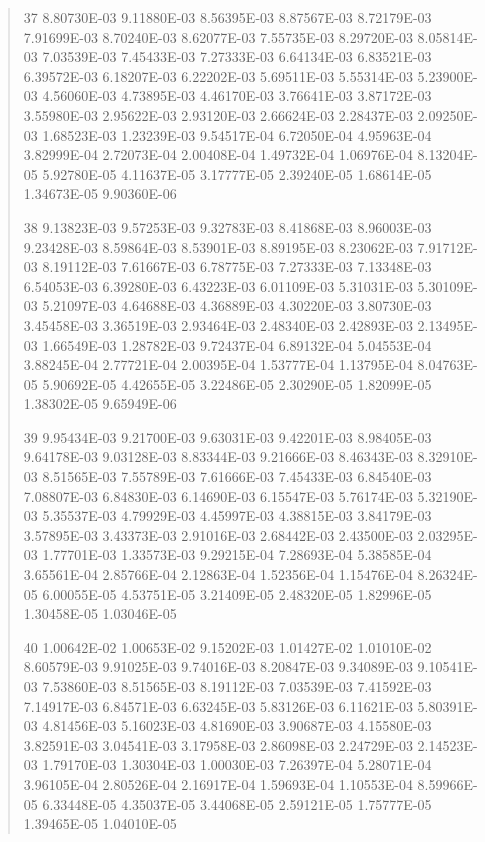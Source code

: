 \documentclass[letterpaper,10pt,english]{sphinxmanual}
\begin{document}
\begin{quote}
\begin{DUlineblock}{0em}
\item[] 37   8.80730E-03  9.11880E-03  8.56395E-03  8.87567E-03  8.72179E-03  7.91699E-03  8.70240E-03  8.62077E-03  7.55735E-03  8.29720E-03  8.05814E-03  7.03539E-03  7.45433E-03  7.27333E-03  6.64134E-03  6.83521E-03  6.39572E-03  6.18207E-03  6.22202E-03  5.69511E-03  5.55314E-03  5.23900E-03  4.56060E-03  4.73895E-03  4.46170E-03  3.76641E-03  3.87172E-03  3.55980E-03  2.95622E-03  2.93120E-03  2.66624E-03  2.28437E-03  2.09250E-03  1.68523E-03  1.23239E-03  9.54517E-04  6.72050E-04  4.95963E-04  3.82999E-04  2.72073E-04  2.00408E-04  1.49732E-04  1.06976E-04  8.13204E-05  5.92780E-05  4.11637E-05  3.17777E-05  2.39240E-05  1.68614E-05  1.34673E-05  9.90360E-06
\item[] 38   9.13823E-03  9.57253E-03  9.32783E-03  8.41868E-03  8.96003E-03  9.23428E-03  8.59864E-03  8.53901E-03  8.89195E-03  8.23062E-03  7.91712E-03  8.19112E-03  7.61667E-03  6.78775E-03  7.27333E-03  7.13348E-03  6.54053E-03  6.39280E-03  6.43223E-03  6.01109E-03  5.31031E-03  5.30109E-03  5.21097E-03  4.64688E-03  4.36889E-03  4.30220E-03  3.80730E-03  3.45458E-03  3.36519E-03  2.93464E-03  2.48340E-03  2.42893E-03  2.13495E-03  1.66549E-03  1.28782E-03  9.72437E-04  6.89132E-04  5.04553E-04  3.88245E-04  2.77721E-04  2.00395E-04  1.53777E-04  1.13795E-04  8.04763E-05  5.90692E-05  4.42655E-05  3.22486E-05  2.30290E-05  1.82099E-05  1.38302E-05  9.65949E-06
\item[] 39   9.95434E-03  9.21700E-03  9.63031E-03  9.42201E-03  8.98405E-03  9.64178E-03  9.03128E-03  8.83344E-03  9.21666E-03  8.46343E-03  8.32910E-03  8.51565E-03  7.55789E-03  7.61666E-03  7.45433E-03  6.84540E-03  7.08807E-03  6.84830E-03  6.14690E-03  6.15547E-03  5.76174E-03  5.32190E-03  5.35537E-03  4.79929E-03  4.45997E-03  4.38815E-03  3.84179E-03  3.57895E-03  3.43373E-03  2.91016E-03  2.68442E-03  2.43500E-03  2.03295E-03  1.77701E-03  1.33573E-03  9.29215E-04  7.28693E-04  5.38585E-04  3.65561E-04  2.85766E-04  2.12863E-04  1.52356E-04  1.15476E-04  8.26324E-05  6.00055E-05  4.53751E-05  3.21409E-05  2.48320E-05  1.82996E-05  1.30458E-05  1.03046E-05
\item[] 40   1.00642E-02  1.00653E-02  9.15202E-03  1.01427E-02  1.01010E-02  8.60579E-03  9.91025E-03  9.74016E-03  8.20847E-03  9.34089E-03  9.10541E-03  7.53860E-03  8.51565E-03  8.19112E-03  7.03539E-03  7.41592E-03  7.14917E-03  6.84571E-03  6.63245E-03  5.83126E-03  6.11621E-03  5.80391E-03  4.81456E-03  5.16023E-03  4.81690E-03  3.90687E-03  4.15580E-03  3.82591E-03  3.04541E-03  3.17958E-03  2.86098E-03  2.24729E-03  2.14523E-03  1.79170E-03  1.30304E-03  1.00030E-03  7.26397E-04  5.28071E-04  3.96105E-04  2.80526E-04  2.16917E-04  1.59693E-04  1.10553E-04  8.59966E-05  6.33448E-05  4.35037E-05  3.44068E-05  2.59121E-05  1.75777E-05  1.39465E-05  1.04010E-05

\end{DUlineblock}
\end{quote}
\end{document}
